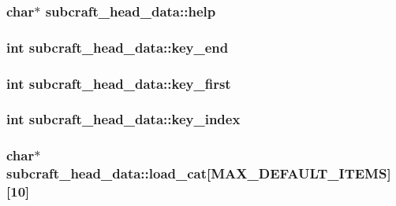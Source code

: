 \hypertarget{structsubcraft__head__data_a71a8c68691ee6c65a645f3fafc8b5b8a}{
\subsubsection[{help}]{\setlength{\rightskip}{0pt plus 5cm}char$\ast$ subcraft\-\_\-head\-\_\-data\-::help}}\label{structsubcraft__head__data_a71a8c68691ee6c65a645f3fafc8b5b8a}
\hypertarget{structsubcraft__head__data_a5b9db569412fe92ab19b28a91d2a4479}{
\subsubsection[{key\-\_\-end}]{\setlength{\rightskip}{0pt plus 5cm}int subcraft\-\_\-head\-\_\-data\-::key\-\_\-end}}\label{structsubcraft__head__data_a5b9db569412fe92ab19b28a91d2a4479}
\hypertarget{structsubcraft__head__data_af7f2b958c290a389d56795129da5b4ef}{
\subsubsection[{key\-\_\-first}]{\setlength{\rightskip}{0pt plus 5cm}int subcraft\-\_\-head\-\_\-data\-::key\-\_\-first}}\label{structsubcraft__head__data_af7f2b958c290a389d56795129da5b4ef}
\hypertarget{structsubcraft__head__data_a79e3da8c9e0fa47f013a2bafd3ee83da}{
\subsubsection[{key\-\_\-index}]{\setlength{\rightskip}{0pt plus 5cm}int subcraft\-\_\-head\-\_\-data\-::key\-\_\-index}}\label{structsubcraft__head__data_a79e3da8c9e0fa47f013a2bafd3ee83da}
\hypertarget{structsubcraft__head__data_aedee02b8935b1a39183128ac9f7bca55}{
\subsubsection[{load\-\_\-cat}]{\setlength{\rightskip}{0pt plus 5cm}char$\ast$ subcraft\-\_\-head\-\_\-data\-::load\-\_\-cat\mbox{[}{\bf M\-A\-X\-\_\-\-D\-E\-F\-A\-U\-L\-T\-\_\-\-I\-T\-E\-M\-S}\mbox{]}\mbox{[}10\mbox{]}}}\label{structsubcraft__head__data_aedee02b8935b1a39183128ac9f7bca55}
